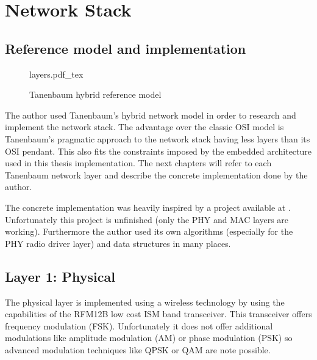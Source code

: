 \chapter{Network Stack}%
\section{Reference model and implementation}%
\begin{figure}[H]
    \centering
    {layers.pdf_tex}
    \caption{Tanenbaum hybrid reference model}
    \label{fig:tannenbaum_model}
\end{figure}

The author used Tanenbaum's hybrid network model \cite{tannenbaum} in order to research and implement the network stack. The advantage over the classic OSI model is Tanenbaum's pragmatic approach to the network stack having less layers than its OSI pendant. This also fits the constraints imposed by the embedded architecture used in this thesis implementation. The next chapters will refer to each Tanenbaum network layer and describe the concrete implementation done by the author.

The concrete implementation was heavily inspired by a project available at \cite{stahl}. Unfortunately this project is unfinished (only the PHY and MAC layers are working). Furthermore the author used its own algorithms (especially for the PHY radio driver layer) and data structures in many places.

\section{Layer 1: Physical}%
The physical layer is implemented using a wireless technology by using the capabilities of the RFM12B low cost ISM band transceiver. This transceiver offers frequency modulation (FSK). Unfortunately it does not offer additional modulations like amplitude modulation (AM) or phase modulation (PSK) so advanced modulation techniques like QPSK or QAM are note possible. 

